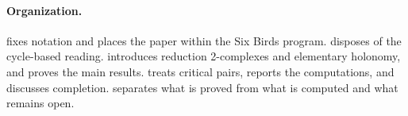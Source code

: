 \paragraph{Organization.}
 fixes notation and places the paper within the Six Birds program.  disposes of the cycle-based reading.  introduces reduction 2-complexes and elementary holonomy, and  proves the main results.  treats critical pairs,  reports the computations, and  discusses completion.  separates what is proved from what is computed and what remains open.
